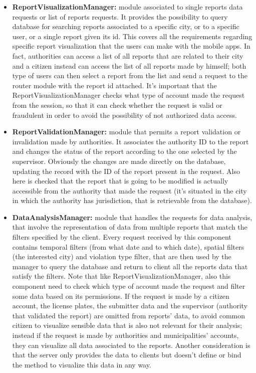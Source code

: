 \begin{itemize}
	\item \textbf{ReportVisualizationManager:}
	module associated to single reports data requests or list of reports requests. It provides the possibility to query database for searching reports associated to a specific city, or to a specific user, or a single report given its id. This covers all the requirements regarding specific report visualization that the users can make with the mobile apps. In fact, authorities can access a list of all reports that are related to their city and a citizen instead can access the list of all reports made by himself; both type of users can then select a report from the list and send a request to the router module with the report id attached. It's important that the ReportVisualizationManager checks what type of account made the request from the session, so that it can check whether the request is valid or fraudulent in order to avoid the possibility of not authorized data access. 
	\item \textbf{ReportValidationManager:}
	module that permits a report validation or invalidation made by authorities. It associates the authority ID to the report and changes the status of the report according to the one selected by the supervisor. Obviously the changes are made directly on the database, updating the record with the ID of the report present in the request. Also here is checked that the report that is going to be modified is actually accessible from the authority that made the request (it's situated in the city in which the authority has jurisdiction, that is retrievable from the database).
	\item \textbf{DataAnalysisManager:}
	module that handles the requests for data analysis, that involve the representation of data from multiple reports that match the filters specified by the client. Every request received by this component contains temporal filters (from what date and to which date), spatial filters (the interested city) and violation type filter, that are then used by the manager to query the database and return to client all the reports data that satisfy the filters. Note that like ReportVisualizationManager, also this component need to check which type of account made the request and filter some data based on its permissions. If the request is made by a citizen account, the license plates, the submitter data and the supervisor (authority that validated the report) are omitted from reports' data, to avoid common citizen to visualize sensible data that is also not relevant for their analysis; instead if the request is made by authorities and municipalities' accounts, they can visualize all data associated to the reports. Another consideration is that the server only provides the data to clients but doesn't define or bind the method to visualize this data in any way.   

\end{itemize}
